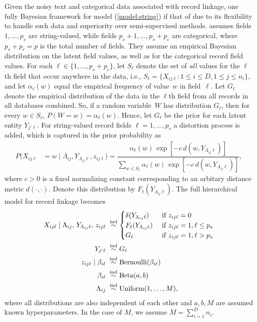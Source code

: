 \documentclass[11pt]{article}
\begin{document}
Given the noisy text and categorical data associated with record linkage, one fully Bayesian framework for model (\ref{model:string}) if that of \cite{steorts15entity} due to its flexibility to handle such data and superiority over semi-supervised methods. 
\cite{steorts15entity} assumes fields $1,\ldots,p_s$ are string-valued, while fields $p_s+1,\ldots,p_s+p_c$ are categorical, where $p_s+p_c=p$ is the total number of fields. They assume an empirical Bayesian distribution on the latent field values, as well as for the categorical record field values. For each $\ell\in\{1,\ldots,p_s+p_c\}$, let $S_\ell$ denote the set of \emph{all} values for the $\ell$th field that occur anywhere in the data, i.e., $S_\ell=\{X_{ij\ell}:1\le i\le D, 1\le j\le n_i\}$, and let $\alpha_\ell(w)$ equal the empirical frequency of value~$w$ in field~$\ell.$ Let $G_\ell$ denote the empirical distribution of the data in the $\ell$th field from all records in all databases combined.  So, if a random variable~$W$ has distribution $G_\ell$, then for every $w\in S_\ell$, $P(W=w)=\alpha_\ell(w)$. Hence, let $G_\ell$  be the prior for each latent entity $Y_{j'\ell}$.
%
For string-valued record fields $\ell = 1, \dots, p_s$ a distortion process is added, which is captured in the prior probability as
\begin{align*}
P(X_{ij\ell}&=w\mid\Lambda_{ij},Y_{\Lambda_{ij}\ell},z_{ij\ell}) 
=\dfrac{\alpha_\ell(w)\,\exp[-c\,d(w,Y_{\Lambda_{ij}\ell})]}{\sum_{w\in S_\ell}\alpha_\ell(w)\,\exp[-c\,d(w,Y_{\Lambda_{ij}\ell})]},
\end{align*}
where $c > 0$ is a fixed normalizing constant corresponding to an arbitary distance metric $d(\cdot,\cdot)$.  Denote this distribution by $F_\ell(Y_{\Lambda_{ij}\ell})$. The full hierarchical model for record linkage becomes
\begin{align}
X_{ij\ell}\mid \Lambda_{ij},\,Y_{\Lambda_{ij}\ell},\,z_{ij\ell}\;&\stackrel{\text{ind}}{\sim}\begin{cases}\delta(Y_{\Lambda_{ij}\ell})&\text{ if }z_{ij\ell}=0\\F_\ell(Y_{\Lambda_{ij}\ell})&\text{ if }z_{ij\ell}=1, \ell\le p_s\\G_\ell&\text{ if }z_{ij\ell}=1, \ell>p_s\end{cases} \notag \\
Y_{j'\ell}\;&\stackrel{\text{ind}}{\sim}G_\ell \notag \\
z_{ij\ell}\mid\beta_{i\ell}\;&\stackrel{\text{ind}}{\sim}\text{Bernoulli}(\beta_{i\ell}) \notag\\
\beta_{i\ell}\;&\stackrel{\text{ind}}{\sim}\text{Beta}(a,b) \notag \\
\Lambda_{ij}\;&\stackrel{\text{ind}}{\sim}\text{Uniform}\left(1,\ldots, M\right),
\label{model:string_spec}
\end{align}
where all distributions are also independent of each other and $a,b, M$ are assumed known hyperparameters. In the case of $M$, we assume $M = \sum\limits_{i = 1}^D n_i$.
\end{document}
